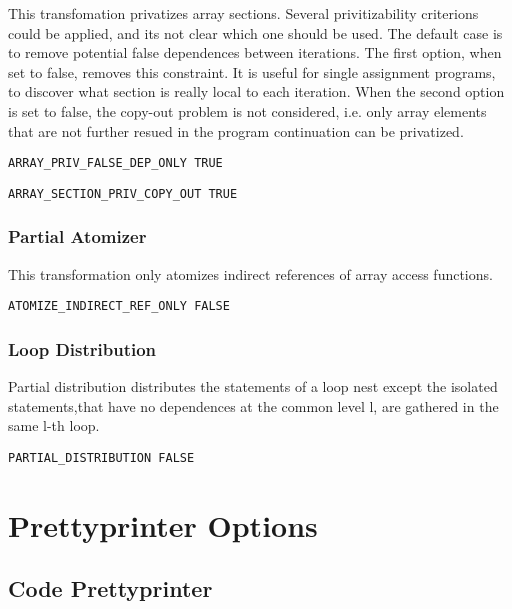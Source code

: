 This transfomation privatizes array sections. Several privitizability
criterions could be applied, and its not clear which one should be used. The
default case is to remove potential false dependences between
iterations. The first option, when set to false, removes this
constraint. It is useful for single assignment programs, to discover what
section is really local to each iteration. When the second option is set to
false, the copy-out problem is not considered, i.e. only array elements that
are not further resued in the program continuation can be privatized. 

\begin{verbatim}
ARRAY_PRIV_FALSE_DEP_ONLY TRUE
\end{verbatim}

\begin{verbatim}
ARRAY_SECTION_PRIV_COPY_OUT TRUE
\end{verbatim}

\subsubsection{Partial Atomizer}

This transformation only atomizes indirect references of array access
functions.

\begin{verbatim}
ATOMIZE_INDIRECT_REF_ONLY FALSE
\end{verbatim}

\subsubsection{Loop Distribution}

Partial distribution distributes the statements of a loop nest except
 the isolated statements,that have no dependences at the common level l,
 are gathered in the same l-th loop.

\begin{verbatim}
PARTIAL_DISTRIBUTION FALSE
\end{verbatim}

\section{Prettyprinter Options}
\label{section-prettyprinters}

\subsection{Code Prettyprinter}

